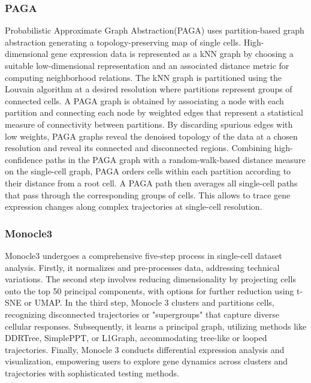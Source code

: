 \subsubsection{PAGA} 
Probabilistic Approximate Graph Abstraction(PAGA) uses partition-based graph abstraction generating a topology-preserving map of single cells\citep{wolf2019paga}. High-dimensional gene expression data is represented as a kNN graph by choosing a suitable low-dimensional representation and an associated distance metric for computing neighborhood relations. The kNN graph is partitioned using the Louvain algorithm at a desired resolution where partitions represent groups of connected cells. A PAGA graph is obtained by associating a node with each partition and connecting each node by weighted edges that represent a statistical measure of connectivity between partitions. By discarding spurious edges with low weights, PAGA graphs reveal the denoised topology of the data at a chosen resolution and reveal its connected and disconnected regions. Combining high-confidence paths in the PAGA graph with a random-walk-based distance measure on the single-cell graph, PAGA orders cells within each partition according to their distance from a root cell. A PAGA path then averages all single-cell paths that pass through the corresponding groups of cells. This allows to trace gene expression changes along complex trajectories at single-cell resolution.

\subsubsection{Monocle3}
Monocle3 undergoes a comprehensive five-step process in single-cell dataset analysis\citep{cao2019monocle3}. Firstly, it normalizes and pre-processes data, addressing technical variations. The second step involves reducing dimensionality by projecting cells onto the top 50 principal components, with options for further reduction using t-SNE or UMAP. In the third step, Monocle 3 clusters and partitions cells, recognizing disconnected trajectories or "supergroups" that capture diverse cellular responses. Subsequently, it learns a principal graph, utilizing methods like DDRTree, SimplePPT, or L1Graph, accommodating tree-like or looped trajectories. Finally, Monocle 3 conducts differential expression analysis and visualization, empowering users to explore gene dynamics across clusters and trajectories with sophisticated testing methods.
